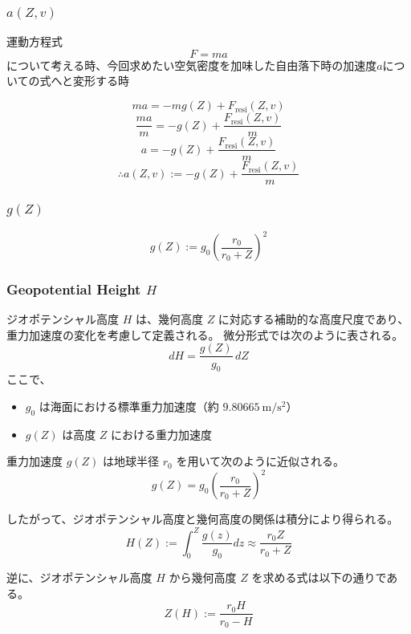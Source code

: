 \documentclass[a4paper,12pt]{article}
\begin{document}
\subsubsection{$a(Z, v)$}
運動方程式
\[
  F = ma
\]
について考える時、今回求めたい空気密度を加味した自由落下時の加速度$a$についての式へと変形する時

\[
  ma = -mg(Z) + F_{\mathrm{resi}}(Z, v)
\]
\[
  \frac{ma}{m} = -g(Z) + \frac{F_{\mathrm{resi}}(Z, v)}{m}
\]
\[
  a = -g(Z) + \frac{F_{\mathrm{resi}}(Z, v)}{m}
\]
\[
  \therefore a(Z, v) := -g(Z) + \frac{F_{\mathrm{resi}}(Z, v)}{m}
\]

\subsubsection{$g(Z)$}

\[
  g(Z) := g_0\left(\frac{r_0}{r_0+Z}\right)^2
\]

\subsubsection{Geopotential Height \(H\)}

ジオポテンシャル高度 \(H\) は、幾何高度 \(Z\) に対応する補助的な高度尺度であり、重力加速度の変化を考慮して定義される。  
微分形式では次のように表される。
\[
dH = \frac{g(Z)}{g_0} \, dZ
\]
ここで、
\begin{itemize}
  \item \(g_0\) は海面における標準重力加速度（約 \(9.80665~\mathrm{m/s^2}\)）
  \item \(g(Z)\) は高度 \(Z\) における重力加速度
\end{itemize}

重力加速度 \(g(Z)\) は地球半径 \(r_0\) を用いて次のように近似される。
\[
g(Z) = g_0 \left( \frac{r_0}{r_0 + Z} \right)^2
\]

したがって、ジオポテンシャル高度と幾何高度の関係は積分により得られる。
\[
H(Z) := \int_0^Z \frac{g(z)}{g_0} dz \approx \frac{r_0 Z}{r_0 + Z}
\]

逆に、ジオポテンシャル高度 \(H\) から幾何高度 \(Z\) を求める式は以下の通りである。
\[
Z(H) := \frac{r_0 H}{r_0 - H}
\]
\end{document}
